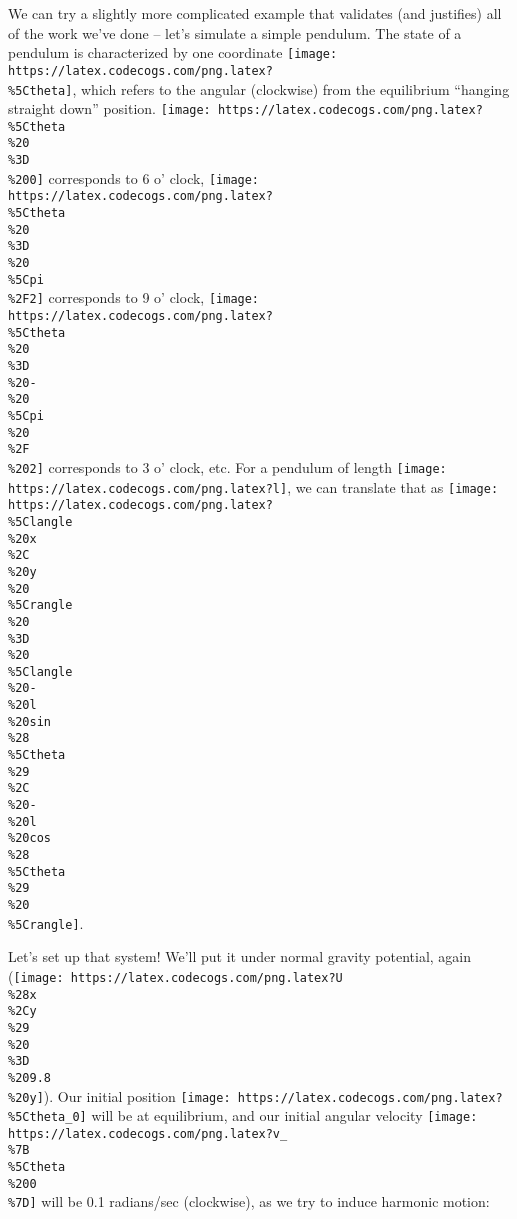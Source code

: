 \documentclass[]{article}
\begin{document}
We can try a slightly more complicated example that validates (and justifies)
all of the work we've done -- let's simulate a simple pendulum. The state of a
pendulum is characterized by one coordinate
\texttt{[image: https://latex.codecogs.com/png.latex?\\\%5Ctheta]}, which refers
to the angular (clockwise) from the equilibrium ``hanging straight down''
position.
\texttt{[image: https://latex.codecogs.com/png.latex?\\\%5Ctheta\\\%20\\\%3D\\\%200]}
corresponds to 6 o' clock,
\texttt{[image: https://latex.codecogs.com/png.latex?\\\%5Ctheta\\\%20\\\%3D\\\%20\\\%5Cpi\\\%2F2]}
corresponds to 9 o' clock,
\texttt{[image: https://latex.codecogs.com/png.latex?\\\%5Ctheta\\\%20\\\%3D\\\%20-\\\%20\\\%5Cpi\\\%20\\\%2F\\\%202]}
corresponds to 3 o' clock, etc. For a pendulum of length
\texttt{[image: https://latex.codecogs.com/png.latex?l]}, we can translate that
as
\texttt{[image: https://latex.codecogs.com/png.latex?\\\%5Clangle\\\%20x\\\%2C\\\%20y\\\%20\\\%5Crangle\\\%20\\\%3D\\\%20\\\%5Clangle\\\%20-\\\%20l\\\%20sin\\\%28\\\%5Ctheta\\\%29\\\%2C\\\%20-\\\%20l\\\%20cos\\\%28\\\%5Ctheta\\\%29\\\%20\\\%5Crangle]}.

Let's set up that system! We'll put it under normal gravity potential, again
(\texttt{[image: https://latex.codecogs.com/png.latex?U\\\%28x\\\%2Cy\\\%29\\\%20\\\%3D\\\%209.8\\\%20y]}).
Our initial position
\texttt{[image: https://latex.codecogs.com/png.latex?\\\%5Ctheta\_0]} will be at
equilibrium, and our initial angular velocity
\texttt{[image: https://latex.codecogs.com/png.latex?v\_\\\%7B\\\%5Ctheta\\\%200\\\%7D]}
will be 0.1 radians/sec (clockwise), as we try to induce harmonic motion:
\end{document}

